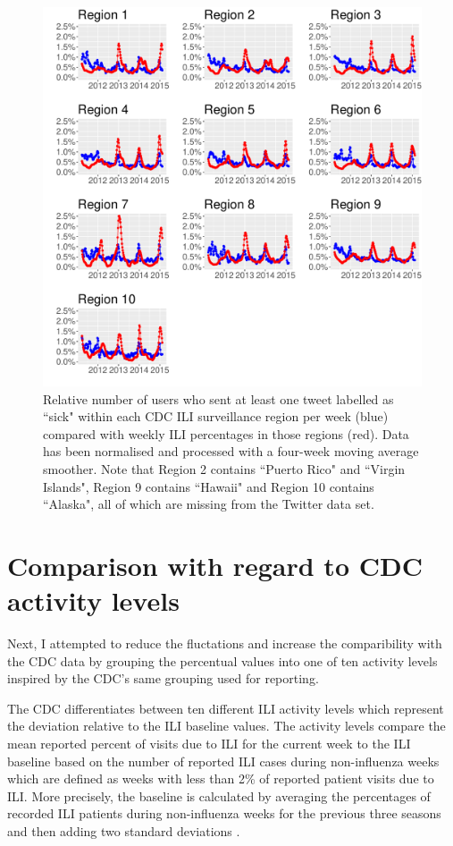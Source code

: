 \documentclass[11pt, a4paper,twoside]{report}\usepackage[]{graphicx}\usepackage[]{color}
\begin{document}
\begin{figure}[H]
\centering
\includegraphics[width=1\linewidth]{cdc_twitter_comp_regs_ma4_user.pdf}
\caption{Relative number of users who sent at least one tweet labelled as ``sick" within each CDC ILI surveillance region per week (blue) compared with weekly ILI percentages in those regions (red). Data has been normalised and processed with a four-week moving average smoother. Note that Region 2 contains ``Puerto Rico" and ``Virgin Islands", Region 9 contains ``Hawaii" and Region 10 contains ``Alaska", all of which are missing from the Twitter data set.}
\label{fig:cdc_tw_comp_regs_ma4}
\end{figure}

\section{Comparison with regard to CDC activity levels}
Next, I attempted to reduce the fluctations and increase the comparibility with the CDC data by grouping the percentual values into one of ten activity levels inspired by the CDC's same grouping used for reporting.\newline

The CDC differentiates between ten different ILI activity levels which represent the deviation relative to the ILI baseline values. The activity levels compare the mean reported percent of visits due to ILI for the current week to the ILI baseline based on the number of reported ILI cases during non-influenza weeks which are defined as weeks with less than 2\% of reported patient visits due to ILI. More precisely, the baseline is calculated by averaging the percentages of recorded ILI patients during non-influenza weeks for the previous three seasons and then adding two standard deviations \citep{cdc_surveillance_2016}.
\end{document}
